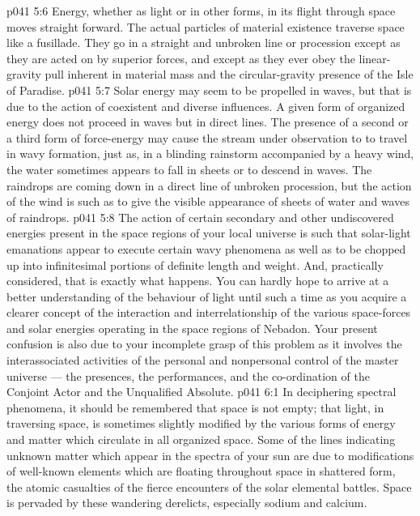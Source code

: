 \vs p041 5:6 \pc Energy, whether as light or in other forms, in its flight through space moves straight forward. The actual particles of material existence traverse space like a fusillade. They go in a straight and unbroken line or procession except as they are acted on by superior forces, and except as they ever obey the linear\hyp{}gravity pull inherent in material mass and the circular\hyp{}gravity presence of the Isle of Paradise.
\vs p041 5:7 \pc Solar energy may seem to be propelled in waves, but that is due to the action of coexistent and diverse influences. A given form of organized energy does not proceed in waves but in direct lines. The presence of a second or a third form of force\hyp{}energy may cause the stream under observation to  to travel in wavy formation, just as, in a blinding rainstorm accompanied by a heavy wind, the water sometimes appears to fall in sheets or to descend in waves. The raindrops are coming down in a direct line of unbroken procession, but the action of the wind is such as to give the visible appearance of sheets of water and waves of raindrops.
\vs p041 5:8 The action of certain secondary and other undiscovered energies present in the space regions of your local universe is such that solar\hyp{}light emanations appear to execute certain wavy phenomena as well as to be chopped up into infinitesimal portions of definite length and weight. And, practically considered, that is exactly what happens. You can hardly hope to arrive at a better understanding of the behaviour of light until such a time as you acquire a clearer concept of the interaction and interrelationship of the various space\hyp{}forces and solar energies operating in the space regions of Nebadon. Your present confusion is also due to your incomplete grasp of this problem as it involves the interassociated activities of the personal and nonpersonal control of the master universe --- the presences, the performances, and the co\hyp{}ordination of the Conjoint Actor and the Unqualified Absolute.
\vs p041 6:1 In deciphering spectral phenomena, it should be remembered that space is not empty; that light, in traversing space, is sometimes slightly modified by the various forms of energy and matter which circulate in all organized space. Some of the lines indicating unknown matter which appear in the spectra of your sun are due to modifications of well\hyp{}known elements which are floating throughout space in shattered form, the atomic casualties of the fierce encounters of the solar elemental battles. Space is pervaded by these wandering derelicts, especially sodium and calcium.
